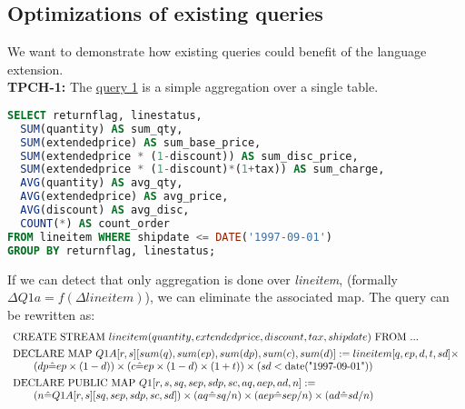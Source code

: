 \documentclass[10pt]{article}
\begin{document}
\subsection{Optimizations of existing queries}
We want to demonstrate how existing queries could benefit of the language extension.\\
\textbf{TPCH-1:} The \href{http://www.tpc.org/tpch/spec/tpch2.16.0.pdf}{query 1} is a simple aggregation over a single table.
\begin{lstlisting}[language=sql]
SELECT returnflag, linestatus, 
  SUM(quantity) AS sum_qty,
  SUM(extendedprice) AS sum_base_price,
  SUM(extendedprice * (1-discount)) AS sum_disc_price,
  SUM(extendedprice * (1-discount)*(1+tax)) AS sum_charge,
  AVG(quantity) AS avg_qty,
  AVG(extendedprice) AS avg_price,
  AVG(discount) AS avg_disc,
  COUNT(*) AS count_order
FROM lineitem WHERE shipdate <= DATE('1997-09-01')
GROUP BY returnflag, linestatus;
\end{lstlisting}
If we can detect that only aggregation is done over {\it lineitem}, (formally $\Delta Q1a=f(\Delta lineitem)$), we can eliminate the associated map. The query can be rewritten as:
\[\begin{array}{l}
\text{CREATE STREAM }lineitem(quantity,extendedprice,discount,tax,shipdate)\text{ FROM }...\vspace{4pt}\\
\text{DECLARE MAP }Q1A[r,s][sum(q),sum(ep),sum(dp),sum(c),sum(d)] := lineitem[q,ep,d,t,sd] \times\\
\qquad (dp \hat= ep\times(1-d)) \times (c \hat= ep\times(1-d)\times(1+t)) \times (sd < \text{date("1997-09-01")})\vspace{4pt}\\
\text{DECLARE PUBLIC MAP }Q1[r,s,sq,sep,sdp,sc,aq,aep,ad,n] := \\
	\qquad (n \hat= Q1A[r,s][sq,sep,sdp,sc,sd]) \times (aq \hat= sq/n) \times (aep \hat= sep/n) \times (ad \hat= sd/n)\vspace{4pt}\\
\end{array}\]
\end{document}
